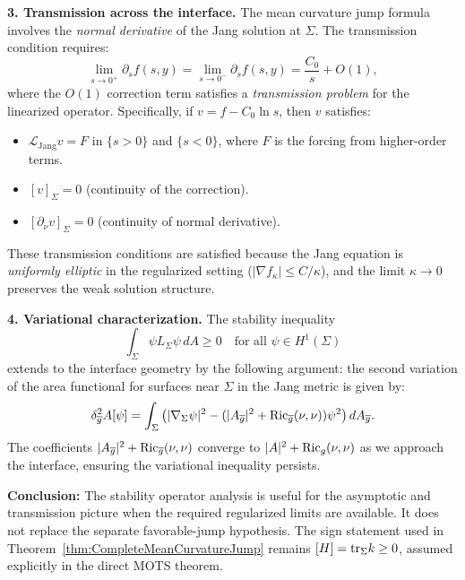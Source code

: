 \begin{remark}
\textbf{3. Transmission across the interface.} The mean curvature jump formula involves the \emph{normal derivative} of the Jang solution at $\Sigma$. The transmission condition requires:
\begin{equation}
    \lim_{s \to 0^+} \partial_s f(s,y) = \lim_{s \to 0^-} \partial_s f(s,y) = \frac{C_0}{s} + O(1),
\end{equation}
where the $O(1)$ correction term satisfies a \emph{transmission problem} for the linearized operator. Specifically, if $v = f - C_0 \ln s$, then $v$ satisfies:
\begin{itemize}
    \item $\mathcal{L}_{\text{Jang}} v = F$ in $\{s > 0\}$ and $\{s < 0\}$, where $F$ is the forcing from higher-order terms.
    \item $[v]_{\Sigma} = 0$ (continuity of the correction).
    \item $[\partial_\nu v]_{\Sigma} = 0$ (continuity of normal derivative).
\end{itemize}
These transmission conditions are satisfied because the Jang equation is \emph{uniformly elliptic} in the regularized setting ($|\nabla f_\kappa| \le C/\kappa$), and the limit $\kappa \to 0$ preserves the weak solution structure.

\textbf{4. Variational characterization.} The stability inequality
\begin{equation}
    \int_\Sigma \psi L_\Sigma \psi \, dA \ge 0 \quad \text{for all } \psi \in H^1(\Sigma)
\end{equation}
extends to the interface geometry by the following argument: the second variation of the area functional for surfaces near $\Sigma$ in the Jang metric is given by:
\begin{equation}
    \delta^2_{\overline{g}} A[\psi] = \int_\Sigma \left( |\nabla_\Sigma \psi|^2 - (|A_{\overline{g}}|^2 + \mathrm{Ric}_{\overline{g}}(\nu,\nu)) \psi^2 \right) dA_{\overline{g}}.
\end{equation}
The coefficients $|A_{\overline{g}}|^2 + \mathrm{Ric}_{\overline{g}}(\nu,\nu)$ converge to $|A|^2 + \mathrm{Ric}_g(\nu,\nu)$ as we approach the interface, ensuring the variational inequality persists.

\textbf{Conclusion:} The stability operator analysis is useful for the asymptotic and transmission picture when the required regularized limits are available. It does not replace the separate favorable-jump hypothesis. The sign statement used in Theorem~\ref{thm:CompleteMeanCurvatureJump} remains $[H]=\mathrm{tr}_\Sigma k\ge0$, assumed explicitly in the direct MOTS theorem.
\end{remark}


